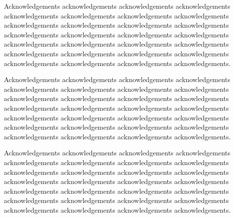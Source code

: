 
Acknowledgements acknowledgements acknowledgements acknowledgements
acknowledgements acknowledgements acknowledgements acknowledgements
acknowledgements acknowledgements acknowledgements acknowledgements
acknowledgements acknowledgements acknowledgements acknowledgements
acknowledgements acknowledgements acknowledgements acknowledgements
acknowledgements acknowledgements acknowledgements acknowledgements
acknowledgements acknowledgements acknowledgements acknowledgements.

Acknowledgements acknowledgements acknowledgements acknowledgements
acknowledgements acknowledgements acknowledgements acknowledgements
acknowledgements acknowledgements acknowledgements acknowledgements
acknowledgements acknowledgements acknowledgements acknowledgements
acknowledgements acknowledgements acknowledgements acknowledgements
acknowledgements acknowledgements acknowledgements acknowledgements
acknowledgements acknowledgements acknowledgements acknowledgements.

Acknowledgements acknowledgements acknowledgements acknowledgements
acknowledgements acknowledgements acknowledgements acknowledgements
acknowledgements acknowledgements acknowledgements acknowledgements
acknowledgements acknowledgements acknowledgements acknowledgements
acknowledgements acknowledgements acknowledgements acknowledgements
acknowledgements acknowledgements acknowledgements acknowledgements
acknowledgements acknowledgements acknowledgements acknowledgements.

